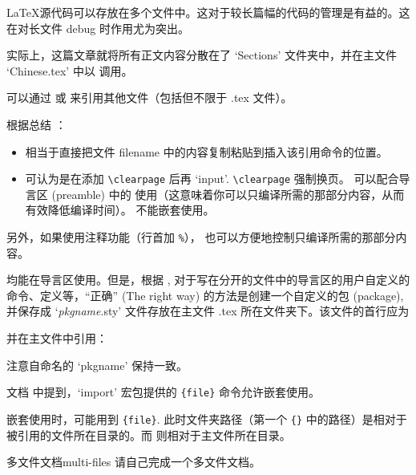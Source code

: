 \LaTeX 源代码可以存放在多个文件中。这对于较长篇幅的代码的管理是有益的。这在对长文件 debug 时作用尤为突出。

实际上，这篇文章就将所有正文内容分散在了 `Sections' 文件夹中，并在主文件 `Chinese.tex' 中以 \verb|| 调用。

可以通过 \verb|| 或 \verb|| 来引用其他文件（包括但不限于 .tex 文件）。

根据总结 \cite{input-include-tex}：
\begin{itemize}
\item \verb|| 相当于直接把文件 filename 中的内容复制粘贴到插入该引用命令的位置。
\item \verb|| 可认为是在添加 \verb|\clearpage| 后再 `input'. \verb|\clearpage| 强制换页。\verb|| 可以配合导言区 (preamble) 中的 \verb|| 使用（这意味着你可以只编译所需的那部分内容，从而有效降低编译时间）。\verb|| 不能嵌套使用。
\end{itemize}
另外，如果使用注释功能（行首加 \verb|%|），\verb|| 也可以方便地控制只编译所需的那部分内容。

\verb|| \verb|| 均能在导言区使用。但是，根据 \cite{input-include-overleaf}, 对于写在分开的文件中的导言区的用户自定义的命令、定义等，“正确” (The right way) 的方法是创建一个自定义的包 (package), 并保存成 `\emph{pkgname}.sty' 文件存放在主文件 .tex 所在文件夹下。该文件的首行应为
\begin{texlst}
\end{texlst}
并在主文件中引用：
\begin{texlst}[numbers=none]
\usepackage{pkgname}
\end{texlst}
注意自命名的 `pkgname' 保持一致。

文档 \cite{input-include-overleaf} 中提到，`import' 宏包提供的 \verb|{file}| 命令允许嵌套使用。

嵌套使用时，可能用到 \verb|{file}|. 此时文件夹路径（第一个 \verb|{}| 中的路径）是相对于被引用的文件所在目录的。而 \verb|| 则相对于主文件所在目录。

\begin{Ex}{多文件文档}{multi-files}
请自己完成一个多文件文档。
\end{Ex}